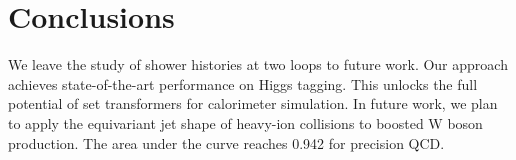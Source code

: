 \section{Conclusions}\label{sec:conclusions}

We leave the study of shower histories at two loops to future work. Our
approach achieves state-of-the-art performance on Higgs tagging. This
unlocks the full potential of set transformers for calorimeter
simulation. In future work, we plan to apply the equivariant jet shape
of heavy-ion collisions to boosted W boson production. The area under
the curve reaches 0.942 for precision QCD.

